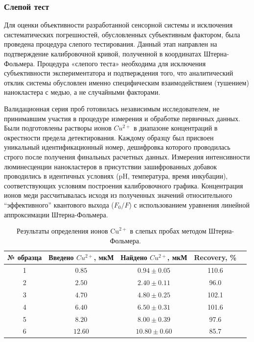 \documentclass[a4paper, 12pt]{article}
\begin{document}
\begin{onehalfspace}
\subsubsection*{Слепой тест}

	Для оценки объективности разработанной сенсорной системы и исключения систематических погрешностей, обусловленных субъективным фактором, была проведена процедура слепого тестирования. Данный этап направлен на подтверждение калибровочной кривой, полученной в координатах Штерна-Фольмера.
    Процедура «слепого теста» необходима для исключения субъективности экспериментатора и подтверждения того, что аналитический отклик системы обусловлен именно специфическим взаимодействием (тушением) нанокластера с медью, а не случайными факторами.

	Валидационная серия проб готовилась независимым исследователем, не принимавшим участия в процедуре измерения и обработке первичных данных.
    Были подготовлены растворы ионов $Cu^{2+}$ в диапазоне концентраций в окрестности предела детектирования.
	Каждому образцу был присвоен уникальный идентификационный номер, дешифровка которого проводилась строго после получения финальных расчетных данных.
    Измерения интенсивности люминесценции нанокластеров в присутствии зашифрованных добавок проводились в идентичных условиях (pH, температура, время инкубации), соответствующих условиям построения калибровочного графика.
	Концентрация ионов меди рассчитывалась исходя из полученных значений относительного \enquote{эффективного} квантового выхода ($F_0/F$) с использованием уравнения линейной аппроксимации Штерна-Фольмера.

	\begin{table}[h!]
	\centering
	\caption{Результаты определения ионов $\text{Cu}^{2+}$ в слепых пробах методом Штерна-Фольмера.}
	\label{tab:blind_test_results}
	\begin{tabular}{|c|c|c|c|c|}
	\hline
	№ образца & Введено $Cu^{2+}$, мкМ & Найдено $Cu^{2+}$, мкМ & Recovery, \%  \\ \hline
	        1 & $0.85$             & $0.94  \pm 0.05$             & 110.6    \\ \hline
	        2 & $2.50$             & $2.40  \pm 0.11$             & 96.0     \\ \hline
	        3 & $4.70$             & $4.80  \pm 0.25$             & 102.1    \\ \hline
	        4 & $6.40$             & $6.50  \pm 0.31$             & 101.6    \\ \hline
	        5 & $8.20$             & $8.00  \pm 0.39$             & 97.6     \\ \hline
            6 & $12.60$            & $10.80 \pm 0.60$             & 85.7     \\ \hline
	\end{tabular}
	\end{table}


\end{onehalfspace}
\end{document}
